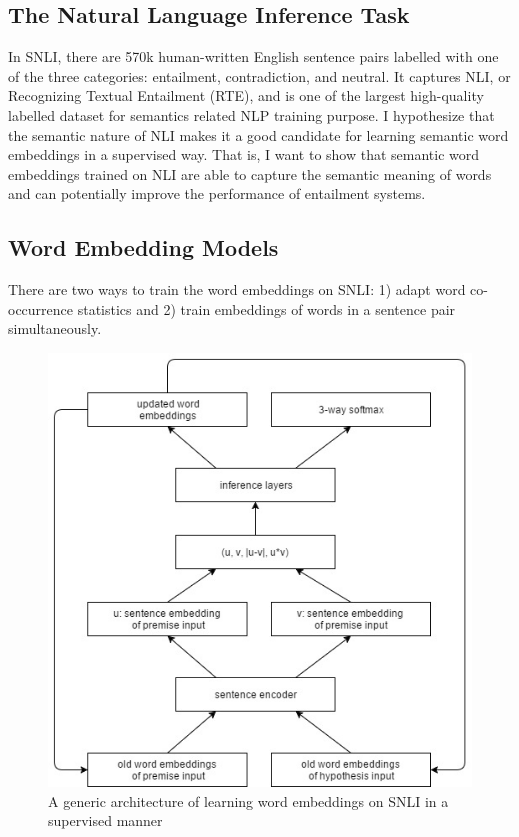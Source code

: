 \documentclass{article}
\begin{document}
\subsection{The Natural Language Inference Task}
In SNLI, there are 570k human-written English sentence pairs labelled with one of the three categories: entailment, contradiction, and neutral. It captures NLI, or Recognizing Textual Entailment (RTE), and is one of the largest high-quality labelled dataset for semantics related NLP training purpose. I hypothesize that the semantic nature of NLI makes it a good candidate for learning semantic word embeddings in a supervised way. That is, I want to show that semantic word embeddings trained on NLI are able to capture the semantic meaning of words and can potentially improve the performance of entailment systems.

\subsection{Word Embedding Models}
There are two ways to train the word embeddings on SNLI: 1) adapt word co-occurrence statistics and 2) train embeddings of words in a sentence pair simultaneously.

\begin{figure}[ht]
\begin{center}
\includegraphics[scale=0.4]{model_architecture}
\end{center}
\caption{A generic architecture of learning word embeddings on SNLI in a supervised manner}
\label{fig:model_arc}
\end{figure}
\end{document}
